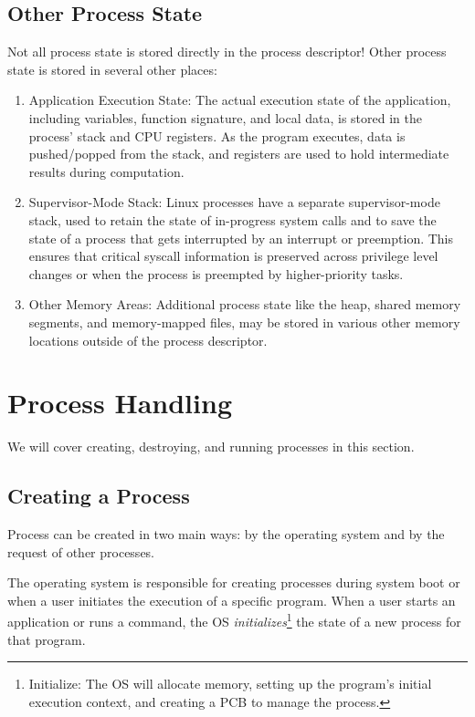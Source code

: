 \documentclass{report}
\begin{document}
\section{Other Process State}
Not all process state is stored directly in the process descriptor! Other process state is stored in
several other places:
\begin{enumerate}[label=\textit{(\roman*)}]
\item Application Execution State: The actual execution state of the application, including
  variables, function signature, and local data, is stored in the process' stack and CPU
  registers. As the program executes, data is pushed/popped from the stack, and registers are used
  to hold intermediate results during computation.
\item Supervisor-Mode Stack: Linux processes have a separate supervisor-mode stack, used to retain
  the state of in-progress system calls and to save the state of a process that gets interrupted
  by an interrupt or preemption. This ensures that critical syscall information is preserved
  across privilege level changes or when the process is preempted by higher-priority tasks.
\item Other Memory Areas: Additional process state like the heap, shared memory segments, and
  memory-mapped files, may be stored in various other memory locations outside of the process
  descriptor.
\end{enumerate}










\chapter{Process Handling}
We will cover creating, destroying, and running processes in this section.





\section{Creating a Process}
Process can be created in two main ways: by the operating system and by the request of other
processes.

The operating system is responsible for creating processes during system boot or when a user
initiates the execution of a specific program. When a user starts an application or runs a command,
the OS \textit{initializes}\footnote{Initialize: The OS will allocate memory, setting up the program's
  initial execution context, and creating a PCB to manage the process.} the state of a new process
for that program. 
\end{document}
